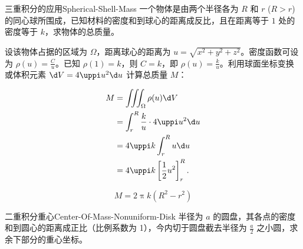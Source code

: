 \begin{problem}{三重积分的应用}{Spherical-Shell-Mass}
    一个物体是由两个半径各为 $R$ 和 $r$ ($R > r$) 的同心球所围成，已知材料的密度和到球心的距离成反比，且在距离等于 $1$ 处的密度等于 $k$，求物体的总质量。
\end{problem}

\begin{solution}
    设该物体占据的区域为 $\Omega$，距离球心的距离为 $u = \sqrt{x^2 + y^2 + z^2}$。密度函数可设为 $\rho(u) = \frac{C}{u}$。已知 $\rho(1) = k$，则 $C = k$，即 $\rho(u) = \frac{k}{u}$。利用球面坐标变换或体积元素 $\d V = 4\uppi u^2 \d u$ 计算总质量 $M$：

    \begin{equation}
        \begin{aligned}
            M & = \iiint_{\Omega} \rho(u) \d V                      \\
              & = \int_{r}^{R} \frac{k}{u} \cdot 4\uppi u^2 \d u    \\
              & = 4\uppi k \int_{r}^{R} u \d u                      \\
              & = 4\uppi k \left[ \frac{1}{2} u^2 \right]_{r}^{R} .
        \end{aligned}
    \end{equation}

    \begin{equation}
        M = \boxed{2\uppi k (R^2 - r^2)}
    \end{equation}
\end{solution}

\begin{problem}{二重积分重心}{Center-Of-Mass-Nonuniform-Disk}
    半径为 $a$ 的圆盘，其各点的密度和到圆心的距离成正比（比例系数为 1），今内切于圆盘截去半径为 $\frac{a}{2}$ 之小圆，求余下部分的重心坐标。
\end{problem}

